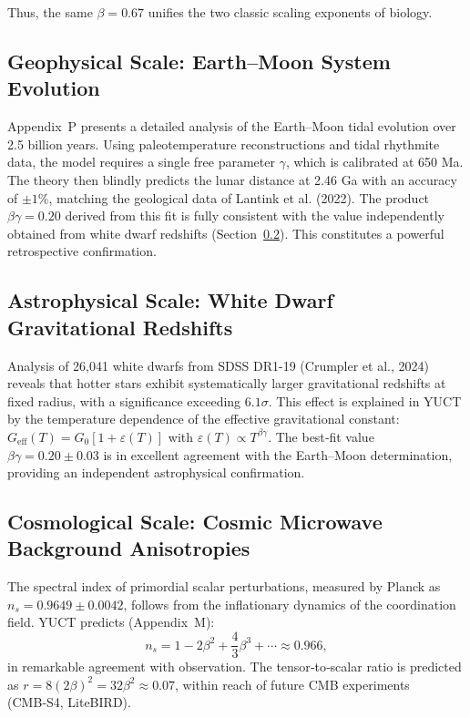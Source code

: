 \documentclass[11pt,a4paper]{article}
\begin{document}
	Thus, the same \(\beta = 0.67\) unifies the two classic scaling exponents of biology.
	
	\subsection{Geophysical Scale: Earth–Moon System Evolution}
	\label{subsec:earth-moon}
	
	Appendix~P presents a detailed analysis of the Earth–Moon tidal evolution over 2.5 billion years. Using paleotemperature reconstructions and tidal rhythmite data, the model requires a single free parameter \(\gamma\), which is calibrated at 650 Ma. The theory then blindly predicts the lunar distance at 2.46 Ga with an accuracy of \(\pm 1\%\), matching the geological data of Lantink et al. (2022). The product \(\beta\gamma = 0.20\) derived from this fit is fully consistent with the value independently obtained from white dwarf redshifts (Section~\ref{subsec:wd}). This constitutes a powerful retrospective confirmation.
	
	\subsection{Astrophysical Scale: White Dwarf Gravitational Redshifts}
	\label{subsec:wd}
	
	Analysis of 26,041 white dwarfs from SDSS DR1-19 (Crumpler et al., 2024) reveals that hotter stars exhibit systematically larger gravitational redshifts at fixed radius, with a significance exceeding \(6.1\sigma\). This effect is explained in YUCT by the temperature dependence of the effective gravitational constant: \(G_{\mathrm{eff}}(T) = G_0[1 + \varepsilon(T)]\) with \(\varepsilon(T) \propto T^{\beta\gamma}\). The best‑fit value \(\beta\gamma = 0.20 \pm 0.03\) is in excellent agreement with the Earth–Moon determination, providing an independent astrophysical confirmation.
	
	\subsection{Cosmological Scale: Cosmic Microwave Background Anisotropies}
	\label{subsec:cmb}
	
	The spectral index of primordial scalar perturbations, measured by Planck as \(n_s = 0.9649 \pm 0.0042\), follows from the inflationary dynamics of the coordination field. YUCT predicts (Appendix~M):
	\[
	n_s = 1 - 2\beta^2 + \frac{4}{3}\beta^3 + \cdots \approx 0.966,
	\]
	in remarkable agreement with observation. The tensor‑to‑scalar ratio is predicted as \(r = 8(2\beta)^2 = 32\beta^2 \approx 0.07\), within reach of future CMB experiments (CMB‑S4, LiteBIRD).
	
\end{document}
